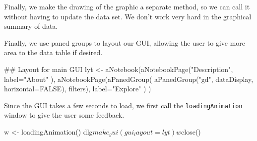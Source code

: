 \documentclass{article}
\newcommand{\code}[1]{\texttt{#1}} %
\begin{document}
Finally, we make the drawing of the graphic a separate method, so we
can call it without having to update the data set. We don't work very
hard in the graphical summary of data.
\begin{Schunk}
\end{Schunk}

Finally, we use paned groups to layout our GUI, allowing the user to
give more area to the data table if desired.

\begin{Schunk}
\begin{Sinput}
 ## Layout for main GUI
 lyt <- aNotebook(aNotebookPage("Description",
                                label="About"
                                ),
                  aNotebookPage(aPanedGroup(
                                            aPanedGroup("gd",
                                                        dataDisplay,
                                                        horizontal=FALSE),
                                            filters),
                                label="Explore"
                                )
                  )
\end{Sinput}
\end{Schunk}

Since the GUI takes a few seconds to load, we first call the
\code{loadingAnimation} window to give the user some feedback.
\begin{Schunk}
\begin{Sinput}
 w <- loadingAnimation()
 dlg$make_gui(gui_layout=lyt)
 w$close()
\end{Sinput}
\end{Schunk}
\end{document}
